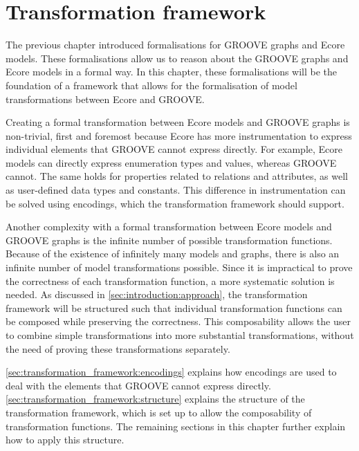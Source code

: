 \chapter{Transformation framework}
\label{chapter:transformation_framework}
The previous chapter introduced formalisations for GROOVE graphs and Ecore models. These formalisations allow us to reason about the GROOVE graphs and Ecore models in a formal way. In this chapter, these formalisations will be the foundation of a framework that allows for the formalisation of model transformations between Ecore and GROOVE.

Creating a formal transformation between Ecore models and GROOVE graphs is non-trivial, first and foremost because Ecore has more instrumentation to express individual elements that GROOVE cannot express directly. For example, Ecore models can directly express enumeration types and values, whereas GROOVE cannot. The same holds for properties related to relations and attributes, as well as user-defined data types and constants. This difference in instrumentation can be solved using encodings, which the transformation framework should support.

Another complexity with a formal transformation between Ecore models and GROOVE graphs is the infinite number of possible transformation functions. Because of the existence of infinitely many models and graphs, there is also an infinite number of model transformations possible. Since it is impractical to prove the correctness of each transformation function, a more systematic solution is needed. As discussed in \cref{sec:introduction:approach}, the transformation framework will be structured such that individual transformation functions can be composed while preserving the correctness. This composability allows the user to combine simple transformations into more substantial transformations, without the need of proving these transformations separately.

\cref{sec:transformation_framework:encodings} explains how encodings are used to deal with the elements that GROOVE cannot express directly. \cref{sec:transformation_framework:structure} explains the structure of the transformation framework, which is set up to allow the composability of transformation functions. The remaining sections in this chapter further explain how to apply this structure.




